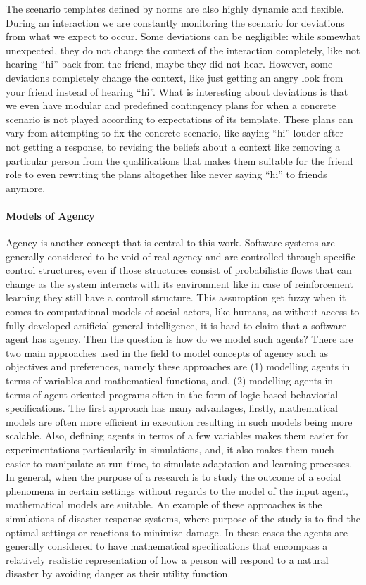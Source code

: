 The scenario templates defined by norms are also highly dynamic and flexible. During an interaction we are constantly monitoring the scenario for deviations from what we expect to occur. Some deviations can be negligible: while somewhat unexpected, they do not change the context of the interaction completely, like not hearing ``hi'' back from the friend, maybe they did not hear. However, some deviations completely change the context, like just getting an angry look from your friend instead of hearing ``hi''. What is interesting about deviations is that we even have modular and predefined contingency plans for when a concrete scenario is not played according to expectations of its template. These plans can vary from attempting to fix the concrete scenario, like saying ``hi'' louder after not getting a response, to revising the beliefs about a context like removing a particular person from the qualifications that makes them suitable for the friend role to even rewriting the plans altogether like never saying ``hi'' to friends anymore.


\paragraph{Models of Agency}
Agency is another concept that is central to this work. Software systems are generally considered to be void of real agency and are controlled through specific control structures, even if those structures consist of probabilistic flows that can change as the system interacts with its environment like in case of reinforcement learning they still have a controll structure. This assumption get fuzzy when it comes to computational models of social actors, like humans, as without access to fully developed artificial general intelligence, it is hard to claim that a software agent has agency. Then the question is how do we model such agents? There are two main approaches used in the field to model concepts of agency such as objectives and preferences, namely these approaches are (1) modelling agents in terms of variables and mathematical functions, and, (2) modelling agents in terms of agent-oriented programs often in the form of logic-based behaviorial specifications. The first approach has many advantages, firstly, mathematical models are often more efficient in execution resulting in such models being more scalable. Also, defining agents in terms of a few variables makes them easier for experimentations particularily in simulations, and, it also makes them much easier to manipulate at run-time, to simulate adaptation and learning processes. In general, when the purpose of a research is to study the outcome of a social phenomena in certain settings without regards to the model of the input agent, mathematical models are suitable. An example of these approaches is the simulations of disaster response systems, where purpose of the study is to find the optimal settings or reactions to minimize damage. In these cases the agents are generally considered to have mathematical specifications that encompass a relatively realistic representation of how a person will respond to a natural disaster by avoiding danger as their utility function\cite{Something}.


